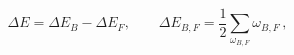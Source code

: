 \begin{equation}
\Delta E=\Delta E_B - \Delta E_F,\qquad \Delta E_{B,F} = \frac 12
\sum_{\omega_{B,F}} \omega_{B,F} \,,\label{DEBF}
\end{equation}

